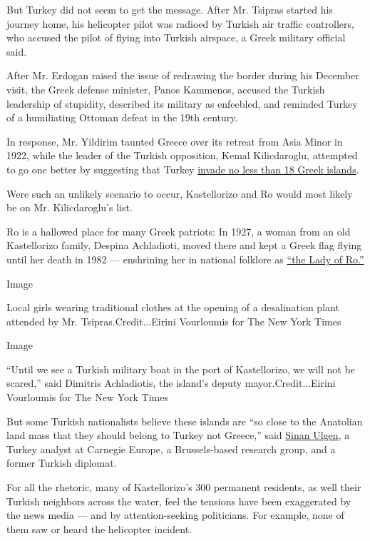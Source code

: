 But Turkey did not seem to get the message. After Mr. Tsipras started
his journey home, his helicopter pilot was radioed by Turkish air
traffic controllers, who accused the pilot of flying into Turkish
airspace, a Greek military official said.

After Mr. Erdogan raised the issue of redrawing the border during his
December visit, the Greek defense minister, Panos Kammenos, accused the
Turkish leadership of stupidity, described its military as enfeebled,
and reminded Turkey of a humiliating Ottoman defeat in the 19th century.

In response, Mr. Yildirim taunted Greece over its retreat from Asia
Minor in 1922, while the leader of the Turkish opposition, Kemal
Kilicdaroglu, attempted to go one better by suggesting that Turkey
\href{http://www.hurriyetdailynews.com/chp-head-slams-greek-defense-minister-vows-to-take-back-18-islands-occupied-by-greece-in-2019-124635}{invade
no less than 18 Greek islands}.

Were such an unlikely scenario to occur, Kastellorizo and Ro would most
likely be on Mr. Kilicdaroglu's list.

Ro is a hallowed place for many Greek patriots: In 1927, a woman from an
old Kastellorizo family, Despina Achladioti, moved there and kept a
Greek flag flying until her death in 1982 --- enshrining her in national
folklore as \href{https://en.wikipedia.org/wiki/Lady_of_Ro}{``the Lady
of Ro.''}

Image

Local girls wearing traditional clothes at the opening of a desalination
plant attended by Mr. Tsipras.Credit...Eirini Vourloumis for The New
York Times

Image

``Until we see a Turkish military boat in the port of Kastellorizo, we
will not be scared,'' said Dimitris Achladiotis, the island's deputy
mayor.Credit...Eirini Vourloumis for The New York Times

But some Turkish nationalists believe these islands are ``so close to
the Anatolian land mass that they should belong to Turkey not Greece,''
said \href{http://carnegieendowment.org/experts/547}{Sinan Ulgen}, a
Turkey analyst at Carnegie Europe, a Brussels-based research group, and
a former Turkish diplomat.

For all the rhetoric, many of Kastellorizo's 300 permanent residents, as
well their Turkish neighbors across the water, feel the tensions have
been exaggerated by the news media --- and by attention-seeking
politicians. For example, none of them saw or heard the helicopter
incident.

